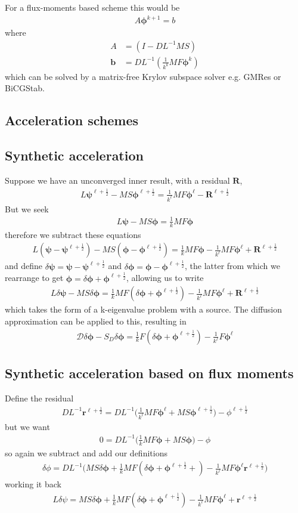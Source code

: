 \documentclass[11pt,letterpaper,notitlepage]{article}
\newcommand{\beqn}{\begin{equation}
		\begin{aligned}}
\newcommand{\eeqn}{\end{aligned}
\end{equation}}
\numberwithin{equation}{section}
\newcommand{\Linv}{L^{-1}}
\newcommand{\bphi}{\boldsymbol{\phi}}
\newcommand{\bpsi}{\boldsymbol{\psi}}
\newcommand{\half}{\frac{1}{2}}
\begin{document}
For a flux-moments based scheme this would be
\beqn 
A \bphi^{k+1} = b
\eeqn 
where 
\beqn 
A &= (I-D\Linv MS) \\
\mathbf{b} &= D\Linv (\frac{1}{k^k} MF\bphi^{k})
\eeqn 
which can be solved by a matrix-free Krylov subspace solver e.g. GMRes or BiCGStab.

\subsection{Acceleration schemes}

\subsection{Synthetic acceleration}
Suppose we have an unconverged inner result, with a residual $\mathbf{R}$,
\beqn 
L \bpsi^{\ell+\half} - MS\bphi^{\ell+\half} = \frac{1}{k^\ell} MF\bphi^\ell - \mathbf{R}^{\ell+\half}
\eeqn 
But we seek
\beqn 
L \bpsi - MS\bphi = \frac{1}{k} MF\bphi
\eeqn 
therefore we subtract these equations
\beqn 
L(\bpsi-\bpsi^{\ell+\half}) -MS(\bphi - \bphi^{\ell+\half})= \frac{1}{k} MF\bphi - \frac{1}{k^\ell} MF\bphi^\ell + \mathbf{R}^{\ell + \half}
\eeqn
and define $\delta \bpsi = \bpsi - \bpsi^{\ell+\half}$ and $\delta \bphi = \bphi - \bphi^{\ell+\half}$, the latter from which we rearrange to get $\bphi = \delta \bphi + \bphi^{\ell+\half}$, allowing us to write 
\beqn 
L\delta \bpsi - MS\delta \bphi = \frac{1}{k}MF(\delta \bphi + \bphi^{\ell+\half})  - \frac{1}{k^\ell} MF\bphi^\ell + \mathbf{R}^{\ell + \half}
\eeqn 
which takes the form of a k-eigenvalue problem with a source. The diffusion approximation can be applied to this, resulting in
\beqn 
\mathcal{D} \delta \bphi - S_D \delta \bphi = \frac{1}{k}F(\delta \bphi + \bphi^{\ell+\half}) - \frac{1}{k^\ell} F\bphi^\ell
\eeqn 

\subsection{Synthetic acceleration based on flux moments}
Define the residual
\beqn 
D\Linv\mathbf{r}^{\ell+\half} = D\Linv \biggr(\frac{1}{k^\ell} MF \bphi^\ell + MS\bphi^{\ell+\half} \biggr) - \phi^{\ell+\half}
\eeqn 
but we want
\beqn 
0 = D\Linv \biggr(\frac{1}{k} MF \bphi + MS\bphi\biggr) - \phi
\eeqn 
so again we subtract and add our definitions
\beqn 
\delta \phi= D\Linv \biggr( MS \delta \bphi + \frac{1}{k} MF(\delta \bphi + \bphi^{\ell+\half} + ) - \frac{1}{k^\ell} MF \bphi^\ell \mathbf{r}^{\ell+\half} \biggr)
\eeqn 
working it back
\beqn 
L\delta \psi = MS \delta \bphi + \frac{1}{k} MF(\delta \bphi + \bphi^{\ell+\half}) - \frac{1}{k^\ell} MF \bphi^\ell + \mathbf{r}^{\ell+\half}
\eeqn 
\end{document}
